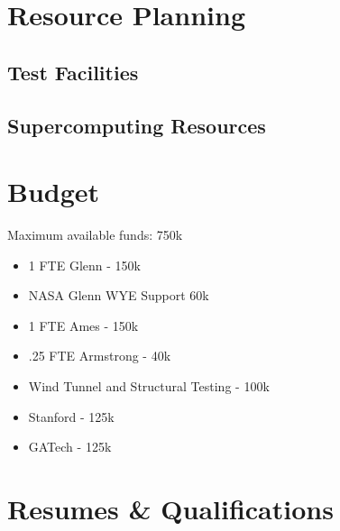 \documentclass[]{aiaa-tc}
\begin{document}
  \section{Resource Planning}
    \subsection{Test Facilities}
    \subsection{Supercomputing Resources}

  \appendix

  \section{Budget}
    Maximum available funds: 750k 
    \begin{itemize}
        \item 1 FTE Glenn - 150k 
        \item NASA Glenn WYE Support 60k 
        \item 1 FTE Ames - 150k 
        \item .25 FTE Armstrong - 40k
        \item Wind Tunnel and Structural Testing - 100k 
        \item Stanford - 125k 
        \item GATech - 125k
    \end{itemize}

  \section{Resumes \& Qualifications}


  
\end{document}
